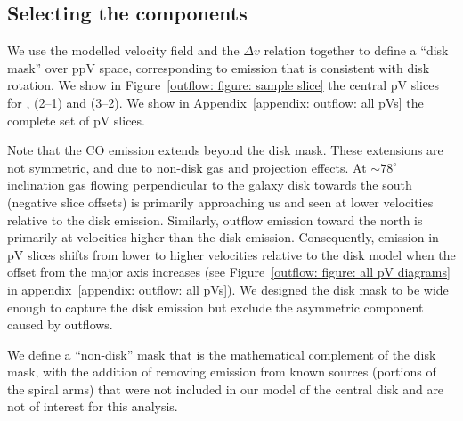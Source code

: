 
\subsection{Selecting the components}

We use the modelled velocity field and the $\Delta v$ relation together to define a ``disk mask'' over ppV space, corresponding to emission that is consistent with disk rotation. We show in Figure~\ref{outflow: figure: sample slice} the central pV slices for , (2--1) and (3--2). We show in Appendix~\ref{appendix: outflow: all pVs} the complete set of pV slices.

Note that the CO emission extends beyond the disk mask. These extensions are not symmetric, and due to non-disk gas and projection effects. At $\sim78^\circ$ inclination gas flowing perpendicular to the galaxy disk towards the south (negative slice offsets) is primarily approaching us and seen at lower velocities relative to the disk emission. Similarly, outflow emission toward the north is primarily at velocities higher than the disk emission. Consequently, emission in pV slices shifts from lower to higher velocities relative to the disk model when the offset from the major axis increases (see Figure~\ref{outflow: figure: all pV diagrams} in appendix~\ref{appendix: outflow: all pVs}). We designed the disk mask to be wide enough to capture the disk emission but exclude the asymmetric component caused by outflows.

We define a ``non-disk'' mask that is the mathematical complement of the disk mask, with the addition of removing emission from known sources (portions of the spiral arms) that were not included in our model of the central disk and are not of interest for this analysis.

